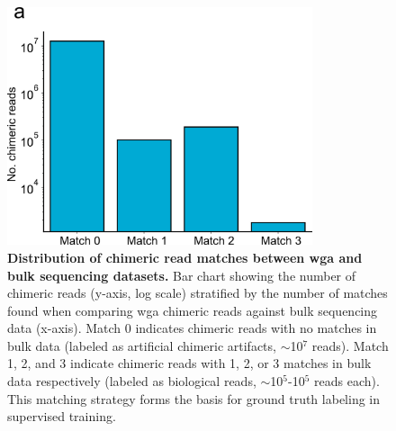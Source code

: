 \documentclass[pdflatex,sn-nature]{sn-jnl}%
\theoremstyle{thmstyleone}%
\theoremstyle{thmstyletwo}%
\theoremstyle{thmstylethree}%
\begin{document}
\backmatter


\makeatletter
\renewcommand{\theHfigure}{extended.\thefigure}
\renewcommand{\theHtable}{extended.\thetable}
\makeatother

\renewcommand{\figurename}{Extended Data Fig.}
\renewcommand{\tablename}{Extended Data Table}
\setcounter{figure}{0}
\setcounter{table}{0}

\begin{figure}[!ht]
	\begin{center}
		\includegraphics[width=0.8\textwidth]{final_figures/sf1}
	\end{center}
	\caption{{\bf Distribution of chimeric read matches between \gls{wga} and bulk sequencing datasets.}
		Bar chart showing the number of chimeric reads (y-axis, log scale) stratified by the number of matches found when comparing \gls{wga} chimeric reads against bulk sequencing data (x-axis). Match 0 indicates chimeric reads with no matches in bulk data (labeled as artificial chimeric artifacts, $\sim$10$^7$ reads). Match 1, 2, and 3 indicate chimeric reads with 1, 2, or 3 matches in bulk data respectively (labeled as biological reads, $\sim$10$^5$-10$^5$ reads each). This matching strategy forms the basis for ground truth labeling in supervised training.}\label{fig:sf1}
\end{figure}
\end{document}
